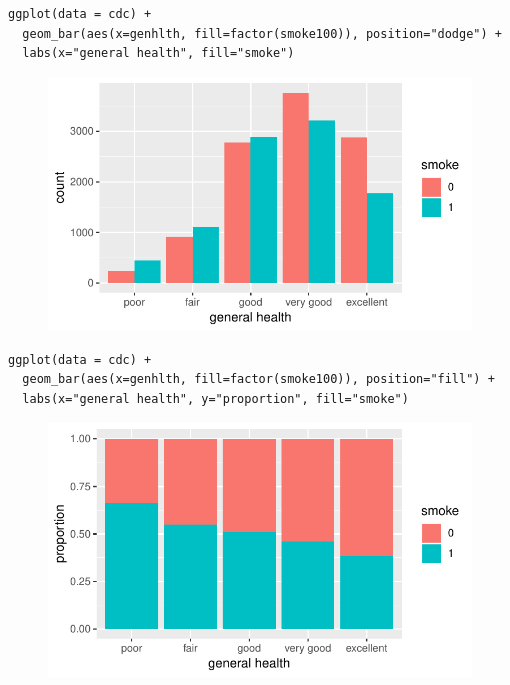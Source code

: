 \documentclass[10pt]{beamer}
\begin{document}
\begin{frame}[fragile]
\small
\begin{verbatim}
ggplot(data = cdc) +
  geom_bar(aes(x=genhlth, fill=factor(smoke100)), position="dodge") + 
  labs(x="general health", fill="smoke")
\end{verbatim}
\begin{figure}[htbp]
\centering
\includegraphics[scale=0.6]{figure/barplot_side_hlthsmoke_gg.pdf}
\end{figure}
\end{frame}

\begin{frame}[fragile]
\small
\begin{verbatim}
ggplot(data = cdc) + 
  geom_bar(aes(x=genhlth, fill=factor(smoke100)), position="fill") + 
  labs(x="general health", y="proportion", fill="smoke")
\end{verbatim}
\begin{figure}[htbp]
\centering
\includegraphics[scale=0.6]{figure/barplot_prop_hlthsmoke_gg.pdf}
\end{figure}
\end{frame}
\end{document}
